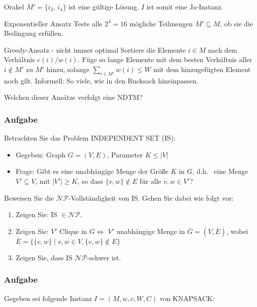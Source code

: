 \documentclass{beamer}
\begin{document}
{\begin{frame}
\begin{block}{Orakel}
  $M' = \{i_2$, $i_4\}$ ist eine gültige Lösung. $I$ ist somit eine Ja-Instanz.
 \end{block}
\begin{block}{Exponentieller Ansatz}
 Teste alle $2^4 = 16$ mögliche Teilmengen $M' \subseteq M$, ob sie die Bedingung erfüllen. 
\end{block}
\begin{block}{Greedy-Ansatz - nicht immer optimal}
 Sortiere die Elemente $i \in M$ nach dem Verhältnis $c(i)/w(i)$. 
 Füge so lange Elemente mit dem besten Verhältnis aller $i \not\in M'$ zu $M'$ hinzu, solange $\sum_{i \in M'} w(i) \leq W$ mit dem hinzugefügten Element noch gilt.
 Informell: So viele, wie in den Rucksack hineinpassen.
\end{block}
\pause
\begin{block}{}
 Welchen dieser Ansätze verfolgt eine NDTM?
\end{block}

\end{frame}


\begin{frame}
\frametitle{Aufgabe}
Betrachten Sie das Problem INDEPENDENT SET (IS):

\begin{itemize}
 \item Gegeben: Graph $G=(V, E)$, Parameter $K \leq |V|$
 \item Frage: Gibt es eine unabhängige Menge der Größe $K$ in $G$, d.h.~ eine Menge $V' \subseteq V$, mit $|V'| \geq K$, so dass $\{v, w\} \notin E$ für alle $v, w \in V'$? 
\end{itemize}
Beweisen Sie die $\mathcal{NP}$-Vollständigkeit von IS. Gehen Sie dabei wie folgt vor:
\begin{enumerate}
 \item Zeigen Sie: IS $\in \mathcal{NP}$.
 \item Zeigen Sie: $V'$ Clique in $G \Longleftrightarrow$ $V'$ unabhängige Menge in $\overline{G}=(V, \overline{E})$, wobei \\
$\overline{E}= \{\{v, w\} \mid v, w \in V, \{v, w\} \notin E\}$
 \item Zeigen Sie, dass IS $\mathcal{NP}$-schwer ist.
\end{enumerate}
\end{frame}


\begin{frame}
\frametitle{Aufgabe}
Gegeben sei folgende Instanz $I=(M, w, c, W, C)$ von KNAPSACK:


\end{frame}}
\end{document}
